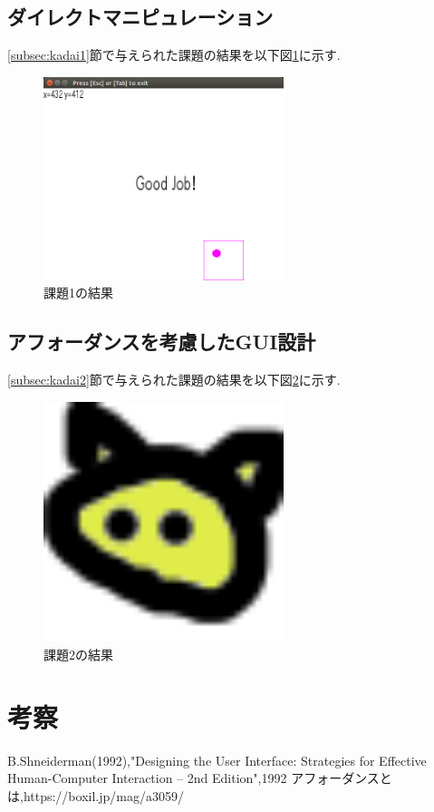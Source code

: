\documentclass{jarticle}
\begin{document}
	\subsection{ダイレクトマニピュレーション}
	\ref{subsec:kadai1}節で与えられた課題の結果を以下図\ref{fig:kadai1}に示す.

	\begin{figure}[H]
	\begin{center}
	\includegraphics[width=7.0cm]{images/kadai1.png}
	\caption{課題1の結果}
	\label{fig:kadai1}
	\end{center}
	\end{figure}


	\subsection{アフォーダンスを考慮したGUI設計}
	\ref{subsec:kadai2}節で与えられた課題の結果を以下図\ref{fig:kadai2}に示す.

	\begin{figure}[H]
	\begin{center}
	\includegraphics[width=7.0cm]{images/kadai2.png}
	\caption{課題2の結果}
	\label{fig:kadai2}
	\end{center}
	\end{figure}


	\section{考察}

	\begin{thebibliography}{99}
	 B.Shneiderman(1992),"Designing the User Interface: Strategies for Effective Human-Computer Interaction -- 2nd Edition",1992
	 アフォーダンスとは,https://boxil.jp/mag/a3059/
	\end{thebibliography}
\end{document}
